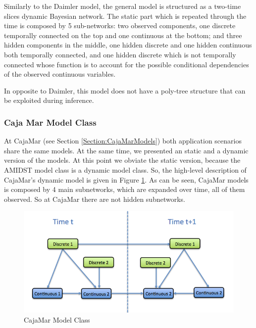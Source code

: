 Similarly to the Daimler model, the general model is structured as a two-time slices dynamic Bayesian network. The static part which is repeated through the time is composed by 5 sub-networks: two observed components, one discrete temporally connected on the top and one continuous at the bottom; and three hidden components in the middle, one hidden discrete and one hidden continuous both temporally connected, and one hidden discrete which is not temporally connected whose function is to account for the possible conditional dependencies of the observed continuous variables.  

In opposite to Daimler,  this model does not have a poly-tree structure that can be exploited during inference. 

\subsubsection*{Caja Mar Model Class}

At CajaMar (see Section \ref{Section:CajaMarModels}) both application scenarios share the  same models. At the same time, we presented an static and a dynamic version of the models.  At this point we obviate the static version, because the AMIDST model class is a dynamic model class. So, the high-level description of CajaMar's dynamic model is given in Figure \ref{Figure:CajaMarModelClass}. As can be seen, CajaMar models is composed by 4 main subnetworks, which are expanded over time, all of them observed. So at CajaMar there are not hidden subnetworks. 

\begin{figure}
\begin{center}
\includegraphics[scale=0.4]{./figures/CajaMarModelClass}
\caption{\label{Figure:CajaMarModelClass} CajaMar Model Class}
\end{center}
\end{figure}



